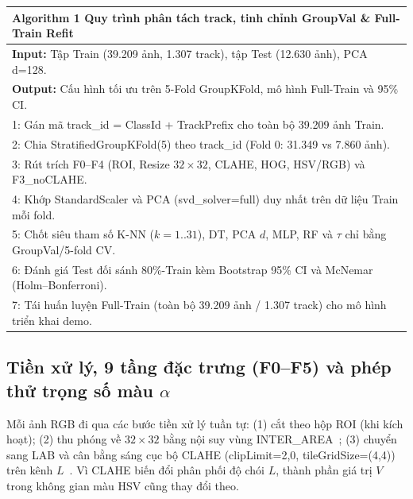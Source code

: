 \documentclass[conference]{IEEEtran}
\begin{document}
\begin{table}[!t]
\centering
\small
\begin{tabular}{@{}p{}@{}}
\hline
\textbf{Algorithm 1} Quy trình phân tách track, tinh chỉnh GroupVal \& Full-Train Refit \\
\hline
\textbf{Input:} Tập Train (39.209 ảnh, 1.307 track), tập Test (12.630 ảnh), PCA d=128. \\
\textbf{Output:} Cấu hình tối ưu trên 5-Fold GroupKFold, mô hình Full-Train và 95\% CI. \\
1: Gán mã track\_id = ClassId + TrackPrefix cho toàn bộ 39.209 ảnh Train. \\
2: Chia StratifiedGroupKFold(5) theo track\_id (Fold 0: 31.349 vs 7.860 ảnh). \\
3: Rút trích F0--F4 (ROI, Resize $32\times 32$, CLAHE, HOG, HSV/RGB) và F3\_noCLAHE. \\
4: Khớp StandardScaler và PCA (svd\_solver=full) duy nhất trên dữ liệu Train mỗi fold. \\
5: Chốt siêu tham số K-NN ($k=1..31$), DT, PCA $d$, MLP, RF và $\tau$ chỉ bằng GroupVal/5-fold CV. \\
6: Đánh giá Test đối sánh 80\%-Train kèm Bootstrap 95\% CI và McNemar (Holm--Bonferroni). \\
7: Tái huấn luyện Full-Train (toàn bộ 39.209 ảnh / 1.307 track) cho mô hình triển khai demo. \\
\hline
\end{tabular}
\end{table}

\subsection{Tiền xử lý, 9 tầng đặc trưng (F0--F5) và phép thử trọng số màu \texorpdfstring{$\alpha$}{alpha}}
Mỗi ảnh RGB đi qua các bước tiền xử lý tuần tự: (1) cắt theo hộp ROI (khi kích hoạt); (2) thu phóng về $32\times 32$ bằng nội suy vùng INTER\_AREA~\cite{bradski2000opencv}; (3) chuyển sang LAB và cân bằng sáng cục bộ CLAHE (clipLimit=2,0, tileGridSize=(4,4)) trên kênh $L$~\cite{zuiderveld1994contrast}. Vì CLAHE biến đổi phân phối độ chói $L$, thành phần giá trị $V$ trong không gian màu HSV cũng thay đổi theo.
\end{document}
